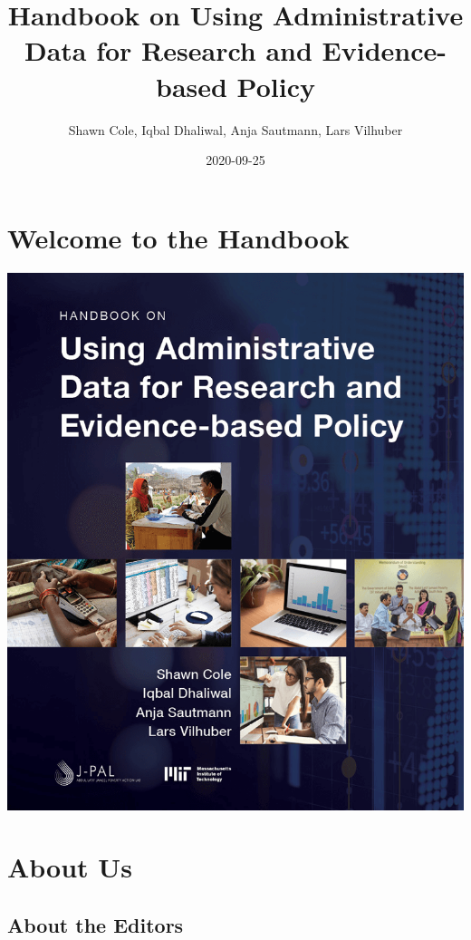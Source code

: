 \documentclass[
]{book}
\title{Handbook on Using Administrative Data for Research and Evidence-based Policy}
\author{Shawn Cole, Iqbal Dhaliwal, Anja Sautmann, Lars Vilhuber}
\date{2020-09-25}
\begin{document}
\maketitle

{
\setcounter{tocdepth}{0}
\tableofcontents
}


\hypertarget{welcome-to-the-handbook}{%
\chapter*{Welcome to the Handbook}\label{welcome-to-the-handbook}}

\includegraphics{./assets/images/webcover.png}

\hypertarget{about}{%
\chapter*{About Us}\label{about}}

\hypertarget{about-the-editors}{%
\section*{About the Editors}\label{about-the-editors}}
\end{document}
